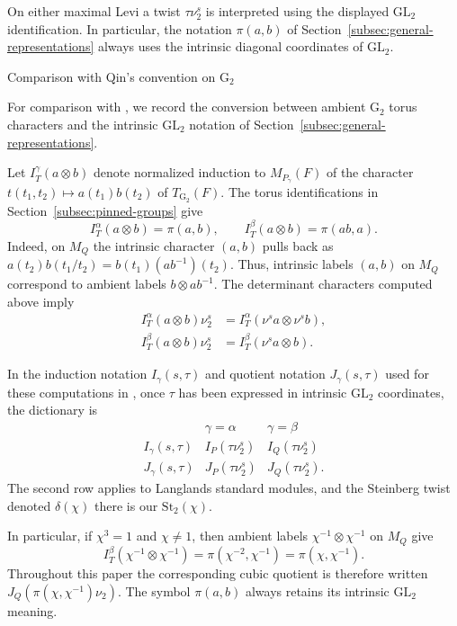 \documentclass[12pt]{amsart}
\makeatletter
\renewcommand{\subsection}{\@startsection{subsection}{2}%
  \z@{.7\linespacing\@plus.5\linespacing}{.35\linespacing}%
  {\normalfont\bfseries\raggedright}}
\theoremstyle{definition}
\theoremstyle{plain}
\theoremstyle{remark}
\def\GL{\mathrm{GL}}
\numberwithin{equation}{section}
\newcommand{\rG}{\mathrm{G}}
\newcommand{\St}{\mathrm{St}}
\makeatother
\begin{document}
On either maximal Levi a twist $\tau\nu_2^s$ is interpreted using
the displayed $\GL_2$ identification. In particular, the notation
$\pi(a,b)$ of Section~\ref{subsec:general-representations} always
uses the intrinsic diagonal coordinates of $\GL_2$.



\subsection{Comparison with Qin's convention on $\rG_2$}\label{subsec:Qin-notation}

For comparison with \cite{Qin2026-AubertZelevinskyInvolutionG2HeckeAlgebras}, we record the
conversion between ambient $\rG_2$ torus characters and the intrinsic $\GL_2$ notation of Section~\ref{subsec:general-representations}.

Let $I_T^\gamma(a\otimes b)$ denote normalized induction to $M_{P_\gamma}(F)$ of the character $t(t_1,t_2)\mapsto a(t_1)b(t_2)$ of $T_{\rG_2}(F)$.
The torus identifications in Section~\ref{subsec:pinned-groups} give
\[
 I_T^\alpha(a\otimes b)=\pi(a,b),
 \qquad I_T^\beta(a\otimes b)=\pi(ab,a).
\]
Indeed, on $M_Q$ the intrinsic character $(a,b)$ pulls back as
$a(t_2)b(t_1/t_2)=b(t_1)(ab^{-1})(t_2)$.
Thus, intrinsic labels $(a,b)$ on $M_Q$ correspond to ambient labels
$b\otimes ab^{-1}$. 
The determinant characters computed above imply
\[
 \begin{aligned}
 I_T^\alpha(a\otimes b)\nu_2^s
    &=I_T^\alpha(\nu^sa\otimes\nu^sb),\\
 I_T^\beta(a\otimes b)\nu_2^s
    &=I_T^\beta(\nu^sa\otimes b).
 \end{aligned}
\]

In the induction notation $I_\gamma(s,\tau)$ and quotient notation
$J_\gamma(s,\tau)$ used for these computations in
\cite{Qin2026-AubertZelevinskyInvolutionG2HeckeAlgebras}, once $\tau$
has been expressed in intrinsic $\GL_2$ coordinates, the dictionary is
\[
 \begin{array}{c|cc}
 &\gamma=\alpha&\gamma=\beta\\ \hline
 I_\gamma(s,\tau)&I_P(\tau\nu_2^s)&I_Q(\tau\nu_2^s)\\
 J_\gamma(s,\tau)&J_P(\tau\nu_2^s)&J_Q(\tau\nu_2^s).
 \end{array}
\]
The second row applies to Langlands standard modules, and the
Steinberg twist denoted $\delta(\chi)$ there is our $\St_2(\chi)$.

In particular, if $\chi^3=1$ and $\chi\ne1$, then ambient labels
$\chi^{-1}\otimes\chi^{-1}$ on $M_Q$ give
\[
 I_T^\beta(\chi^{-1}\otimes\chi^{-1})
     =\pi(\chi^{-2},\chi^{-1})=\pi(\chi,\chi^{-1}).
\]
Throughout this paper the corresponding cubic quotient is therefore
written $J_Q(\pi(\chi,\chi^{-1})\nu_2)$.
The symbol $\pi(a,b)$ always retains its intrinsic $\GL_2$ meaning.
\end{document}
